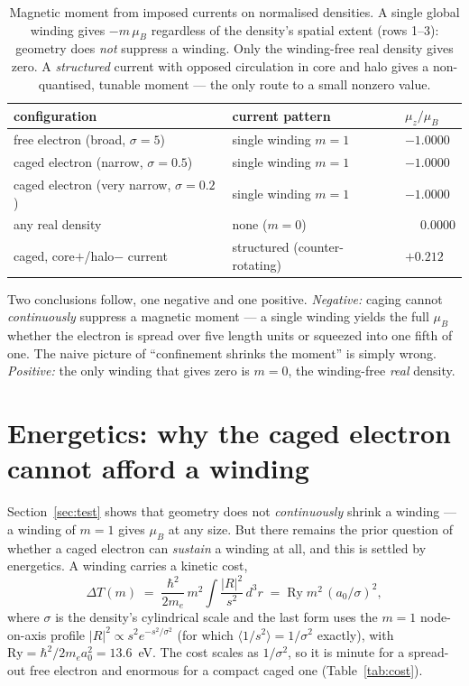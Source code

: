 \documentclass[11pt]{article}
\begin{document}
\begin{table}[h]
\centering
\small
\renewcommand{\arraystretch}{1.15}
\begin{tabular}{lll}
\toprule
configuration & current pattern & $\mu_z/\mu_B$ \\
\midrule
free electron (broad, $\sigma=5$)     & single winding $m=1$ & $-1.0000$ \\
caged electron (narrow, $\sigma=0.5$) & single winding $m=1$ & $-1.0000$ \\
caged electron (very narrow, $\sigma=0.2$) & single winding $m=1$ & $-1.0000$ \\
any real density                      & none ($m=0$)         & $\phantom{-}0.0000$ \\
\midrule
caged, core$+$/halo$-$ current        & structured (counter-rotating) & $+0.212$ \\
\bottomrule
\end{tabular}
\caption{Magnetic moment from imposed currents on normalised densities. A single global winding gives
$-m\,\mu_B$ regardless of the density's spatial extent (rows 1--3): geometry does \emph{not} suppress a
winding. Only the winding-free real density gives zero. A \emph{structured} current with opposed
circulation in core and halo gives a non-quantised, tunable moment --- the only route to a small nonzero
value.}
\label{tab:test}
\end{table}

Two conclusions follow, one negative and one positive. \emph{Negative:} caging cannot
\emph{continuously} suppress a magnetic moment --- a single winding yields the full $\mu_B$ whether the
electron is spread over five length units or squeezed into one fifth of one. The naive picture of
``confinement shrinks the moment'' is simply wrong. \emph{Positive:} the only winding that gives zero is
$m=0$, the winding-free \emph{real} density.

\section{Energetics: why the caged electron cannot afford a winding}
\label{sec:energetics}

Section~\ref{sec:test} shows that geometry does not \emph{continuously} shrink a winding --- a winding of
$m=1$ gives $\mu_B$ at any size. But there remains the prior question of whether a caged electron can
\emph{sustain} a winding at all, and this is settled by energetics. A winding carries a kinetic cost,
\begin{equation}
\Delta T(m) \;=\; \frac{\hbar^2}{2m_e}\,m^2\!\int \frac{|R|^2}{s^2}\,d^3r
\;=\; \mathrm{Ry}\;m^2\,(a_0/\sigma)^2 ,
\label{eq:cost}
\end{equation}
where $\sigma$ is the density's cylindrical scale and the last form uses the $m=1$ node-on-axis profile
$|R|^2\propto s^2 e^{-s^2/\sigma^2}$ (for which $\langle1/s^2\rangle = 1/\sigma^2$ exactly), with
$\mathrm{Ry}=\hbar^2/2m_e a_0^2 = 13.6$~eV. The cost scales as $1/\sigma^2$, so it is minute for a
spread-out free electron and enormous for a compact caged one (Table~\ref{tab:cost}).
\end{document}
